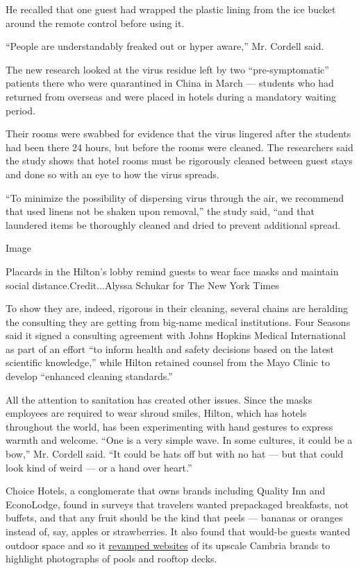 He recalled that one guest had wrapped the plastic lining from the ice
bucket around the remote control before using it.

``People are understandably freaked out or hyper aware,'' Mr. Cordell
said.

The new research looked at the virus residue left by two
``pre-symptomatic'' patients there who were quarantined in China in
March --- students who had returned from overseas and were placed in
hotels during a mandatory waiting period.

Their rooms were swabbed for evidence that the virus lingered after the
students had been there 24 hours, but before the rooms were cleaned. The
researchers said the study shows that hotel rooms must be rigorously
cleaned between guest stays and done so with an eye to how the virus
spreads.

``To minimize the possibility of dispersing virus through the air, we
recommend that used linens not be shaken upon removal,'' the study said,
``and that laundered items be thoroughly cleaned and dried to prevent
additional spread.

Image

Placards in the Hilton's lobby remind guests to wear face masks and
maintain social distance.Credit...Alyssa Schukar for The New York Times

To show they are, indeed, rigorous in their cleaning, several chains are
heralding the consulting they are getting from big-name medical
institutions. Four Seasons said it signed a consulting agreement with
Johns Hopkins Medical International as part of an effort ``to inform
health and safety decisions based on the latest scientific knowledge,''
while Hilton retained counsel from the Mayo Clinic to develop ``enhanced
cleaning standards.''

All the attention to sanitation has created other issues. Since the
masks employees are required to wear shroud smiles, Hilton, which has
hotels throughout the world, has been experimenting with hand gestures
to express warmth and welcome. ``One is a very simple wave. In some
cultures, it could be a bow,'' Mr. Cordell said. ``It could be hats off
but with no hat --- but that could look kind of weird --- or a hand over
heart.''

Choice Hotels, a conglomerate that owns brands including Quality Inn and
EconoLodge, found in surveys that travelers wanted prepackaged
breakfasts, not buffets, and that any fruit should be the kind that
peels --- bananas or oranges instead of, say, apples or strawberries. It
also found that would-be guests wanted outdoor space and so it
\href{https://www.choicehotels.com/california/el-segundo/cambria-hotels/cad84}{revamped
websites} of its upscale Cambria brands to highlight photographs of
pools and rooftop decks.

